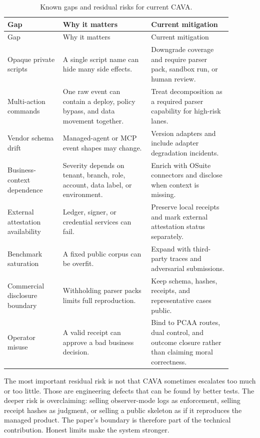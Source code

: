 \documentclass[11pt]{article}
\begin{document}
\begin{longtable}{@{}L{0.22\linewidth}L{0.35\linewidth}L{0.32\linewidth}@{}}
\caption{Known gaps and residual risks for current CAVA.}
\label{tab:known-gaps}\\
\toprule
Gap & Why it matters & Current mitigation \\
\midrule
\endfirsthead
\toprule
Gap & Why it matters & Current mitigation \\
\midrule
\endhead
Opaque private scripts & A single script name can hide many side effects. & Downgrade coverage and require parser pack, sandbox run, or human review. \\
Multi-action commands & One raw event can contain a deploy, policy bypass, and data movement together. & Treat decomposition as a required parser capability for high-risk lanes. \\
Vendor schema drift & Managed-agent or MCP event shapes may change. & Version adapters and include adapter degradation incidents. \\
Business-context dependence & Severity depends on tenant, branch, role, account, data label, or environment. & Enrich with OSuite connectors and disclose when context is missing. \\
External attestation availability & Ledger, signer, or credential services can fail. & Preserve local receipts and mark external attestation status separately. \\
Benchmark saturation & A fixed public corpus can be overfit. & Expand with third-party traces and adversarial submissions. \\
Commercial disclosure boundary & Withholding parser packs limits full reproduction. & Keep schema, hashes, receipts, and representative cases public. \\
Operator misuse & A valid receipt can approve a bad business decision. & Bind to PCAA routes, dual control, and outcome closure rather than claiming moral correctness. \\
\bottomrule
\end{longtable}

The most important residual risk is not that CAVA sometimes escalates too much or too little. Those are engineering defects that can be found by better tests. The deeper risk is overclaiming: selling observer-mode logs as enforcement, selling receipt hashes as judgment, or selling a public skeleton as if it reproduces the managed product. The paper's boundary is therefore part of the technical contribution. Honest limits make the system stronger.
\end{document}
